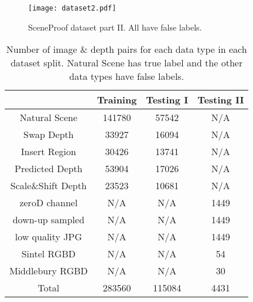\documentclass[10pt,twocolumn,letterpaper]{article}
\begin{document}
\begin{figure*}[h]
\begin{center}
\resizebox{0.9\textwidth}{!}
{
\texttt{[image: dataset2.pdf]}
}
\caption{SceneProof dataset part II. All have false labels.}
\label{dataset2}
\end{center}
\vspace{-2ex}
\end{figure*}

\begin{table}[h]
\centering
{
\begin{tabular}{ c | c | c | c }
   & Training & Testing I & Testing II \\
  \hline
  Natural Scene & 141780 & 57542 & N/A\\
  Swap Depth & 33927 & 16094 & N/A\\
  Insert Region & 30426 & 13741 & N/A\\
  Predicted Depth & 53904 & 17026 & N/A\\
  Scale\&Shift Depth & 23523 & 10681 & N/A\\
  zeroD channel& N/A & N/A & 1449 \\
  down-up sampled& N/A & N/A & 1449 \\
  low quality JPG& N/A & N/A & 1449 \\
  Sintel RGBD& N/A & N/A & 54\\
  Middlebury RGBD& N/A & N/A & 30\\
 Total & 283560 & 115084 & 4431 \\
\end{tabular}
}
\vspace{2mm}
\caption{Number of image \& depth pairs for each data type in each dataset split. Natural Scene has true label and the other data types have false labels. }
\label{dataset_details}
\end{table}
\end{document}
